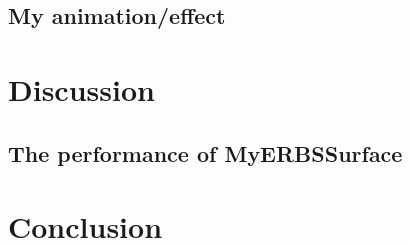\documentclass[a4paper,11pt]{article}
\begin{document}
\subsection{My animation/effect}

\section{Discussion}
\subsection{The performance of MyERBSSurface}


\section{Conclusion}


\end{document}
